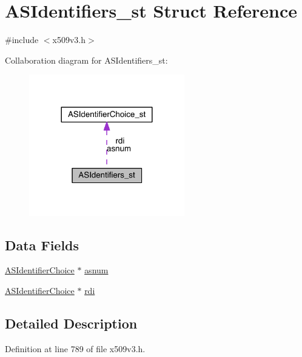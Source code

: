 \hypertarget{struct_a_s_identifiers__st}{}\section{A\+S\+Identifiers\+\_\+st Struct Reference}
\label{struct_a_s_identifiers__st}


{\ttfamily \#include $<$x509v3.\+h$>$}



Collaboration diagram for A\+S\+Identifiers\+\_\+st\+:\nopagebreak
\begin{figure}[H]
\begin{center}
\leavevmode
\includegraphics[width=192pt]{struct_a_s_identifiers__st__coll__graph}
\end{center}
\end{figure}
\subsection*{Data Fields}
\begin{DoxyCompactItemize}
\item 
\hyperlink{crypto_2x509v3_2x509v3_8h_a58bbb14606fab0491521bbbb538ae362}{A\+S\+Identifier\+Choice} $\ast$ \hyperlink{struct_a_s_identifiers__st_a9e9c1371c2681c33188018f2e08acd3d}{asnum}
\item 
\hyperlink{crypto_2x509v3_2x509v3_8h_a58bbb14606fab0491521bbbb538ae362}{A\+S\+Identifier\+Choice} $\ast$ \hyperlink{struct_a_s_identifiers__st_aa977a45203a9b1f06efdf18c3fc39a13}{rdi}
\end{DoxyCompactItemize}


\subsection{Detailed Description}


Definition at line 789 of file x509v3.\+h.



